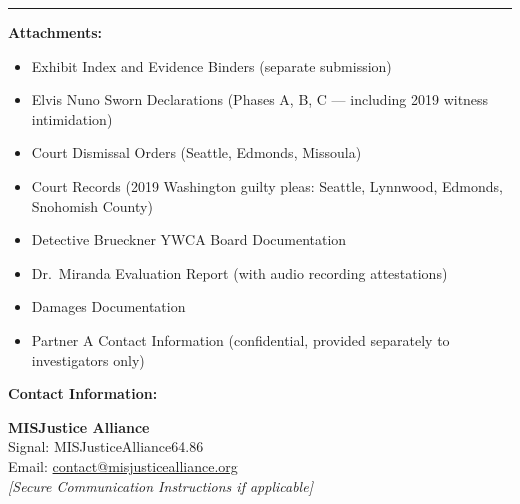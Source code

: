 \documentclass[11pt, letterpaper]{article}
\newcommand{\sectiontitle}[1]{\vspace{0.2in}\noindent\textcolor{NavyBlue}{\large\textbf{#1}}\vspace{0.1in}}
\begin{document}
\vspace{0.3in}
\noindent\rule{\textwidth}{0.4pt}

\sectiontitle{Attachments:}
\begin{itemize}[leftmargin=*,itemsep=2pt]
    \item Exhibit Index and Evidence Binders (separate submission)
    \item Elvis Nuno Sworn Declarations (Phases A, B, C --- including 2019 witness intimidation)
    \item Court Dismissal Orders (Seattle, Edmonds, Missoula)
    \item Court Records (2019 Washington guilty pleas: Seattle, Lynnwood, Edmonds, Snohomish County)
    \item Detective Brueckner YWCA Board Documentation
    \item Dr.\ Miranda Evaluation Report (with audio recording attestations)
    \item Damages Documentation
    \item Partner A Contact Information (confidential, provided separately to investigators only)
\end{itemize}

\sectiontitle{Contact Information:}

\noindent
\textbf{MISJustice Alliance}\\
Signal: MISJusticeAlliance64.86\\
Email: \href{mailto:contact@misjusticealliance.org}{contact@misjusticealliance.org}\\
\textit{[Secure Communication Instructions if applicable]}
\end{document}
